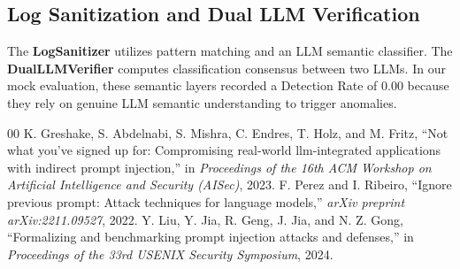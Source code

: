 \documentclass[conference]{IEEEtran}
\begin{document}
\subsection{Log Sanitization and Dual LLM Verification}
The \textbf{LogSanitizer} utilizes pattern matching and an LLM semantic classifier. The \textbf{DualLLMVerifier} computes classification consensus between two LLMs. In our mock evaluation, these semantic layers recorded a Detection Rate of 0.00 because they rely on genuine LLM semantic understanding to trigger anomalies.

\begin{thebibliography}{00}
 K. Greshake, S. Abdelnabi, S. Mishra, C. Endres, T. Holz, and M. Fritz, ``Not what you've signed up for: Compromising real-world llm-integrated applications with indirect prompt injection,'' in \textit{Proceedings of the 16th ACM Workshop on Artificial Intelligence and Security (AISec)}, 2023.
 F. Perez and I. Ribeiro, ``Ignore previous prompt: Attack techniques for language models,'' \textit{arXiv preprint arXiv:2211.09527}, 2022.
 Y. Liu, Y. Jia, R. Geng, J. Jia, and N. Z. Gong, ``Formalizing and benchmarking prompt injection attacks and defenses,'' in \textit{Proceedings of the 33rd USENIX Security Symposium}, 2024.
\end{thebibliography}
\end{document}
